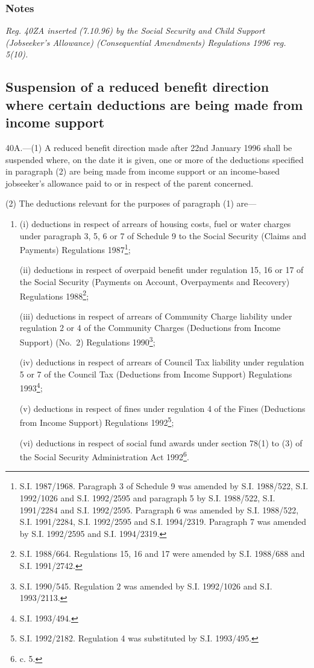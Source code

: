 \documentclass[a4paper]{article}
\newcommand\amendment[1]{\subsubsection*{Notes}{\itshape\frenchspacing\footnotesize #1 \par}}
\begin{document}
\amendment{
Reg. 40ZA inserted (7.10.96) by the Social Security and Child Support (Jobseeker's Allowance) (Consequential Amendments) Regulations 1996 reg. 5(10).
}

\subsection[40A. Suspension of a reduced benefit direction where certain deductions are being made from income support]{Suspension of a reduced benefit direction where certain deductions are being made from income support}

40A.—(1) A reduced benefit direction made after 22nd January 1996 shall be suspended where, on the date it is given, one or more of the deductions specified in paragraph (2) are being made from income support 
or an income-based jobseeker’s allowance  %
paid to or in respect of the parent concerned.

(2) The deductions relevant for the purposes of paragraph (1) are—
\begin{enumerate}\item[]
(i) deductions in respect of arrears of housing costs, fuel or water charges under paragraph 3, 5, 6 or 7 of Schedule 9 to the Social Security (Claims and Payments) Regulations 1987\footnote{\frenchspacing S.I. 1987/1968. Paragraph 3 of Schedule 9 was amended by S.I. 1988/522, S.I. 1992/1026 and S.I. 1992/2595 and paragraph 5 by S.I. 1988/522, S.I. 1991/2284 and S.I. 1992/2595. Paragraph 6 was amended by S.I. 1988/522, S.I. 1991/2284, S.I. 1992/2595 and S.I. 1994/2319. Paragraph 7 was amended by S.I. 1992/2595 and S.I. 1994/2319.};

(ii) deductions in respect of overpaid benefit under regulation 15, 16 or 17 of the Social Security (Payments on Account, Overpayments and Recovery) Regulations 1988\footnote{\frenchspacing S.I. 1988/664. Regulations 15, 16 and 17 were amended by S.I. 1988/688 and S.I. 1991/2742.};

(iii) deductions in respect of arrears of Community Charge liability under regulation 2 or 4 of the Community Charges (Deductions from Income Support) (No.\ 2) Regulations 1990\footnote{\frenchspacing S.I. 1990/545. Regulation 2 was amended by S.I. 1992/1026 and S.I. 1993/2113.};

(iv) deductions in respect of arrears of Council Tax liability under regulation 5 or 7 of the Council Tax (Deductions from Income Support) Regulations 1993\footnote{\frenchspacing S.I. 1993/494.};

(v) deductions in respect of fines under regulation 4 of the Fines (Deductions from Income Support) Regulations 1992\footnote{\frenchspacing S.I. 1992/2182. Regulation 4 was substituted by S.I. 1993/495.};

(vi) deductions in respect of social fund awards under section 78(1) to (3) of the Social Security Administration Act 1992\footnote{ c. 5.}.
\end{enumerate}
\end{document}
